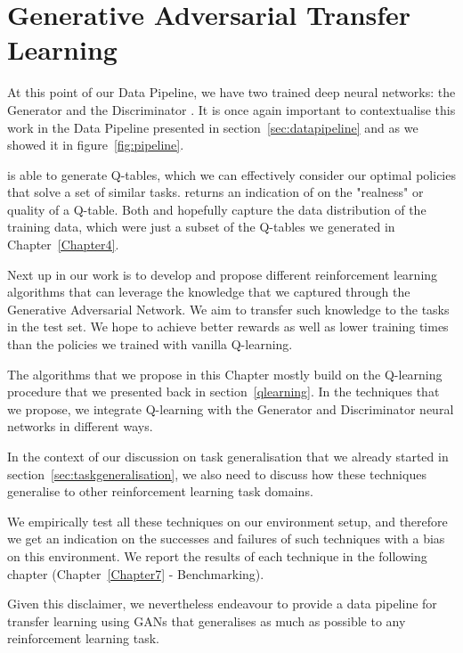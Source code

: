 
\chapter{Generative Adversarial Transfer Learning} %
\label{Chapter6}
At this point of our Data Pipeline, we have two trained deep neural networks: the Generator  and the Discriminator . It is once again important to contextualise this work in the Data Pipeline presented in section~\ref{sec:datapipeline} and as we showed it in figure~\ref{fig:pipeline}.

 is able to generate Q-tables, which we can effectively consider our optimal policies that solve a set of similar tasks.  returns an indication of on the "realness" or quality of a Q-table.
Both  and  hopefully capture the data distribution of the training data, which were just a subset of the Q-tables we generated in Chapter~\ref{Chapter4}.

Next up in our work is to develop and propose different reinforcement learning algorithms that can leverage the knowledge that we captured through the Generative Adversarial Network. We aim to transfer such knowledge to the tasks in the test set. We hope to achieve better rewards as well as lower training times than the policies we trained with vanilla Q-learning.

The algorithms that we propose in this Chapter mostly build on the Q-learning procedure that we presented back in section~\ref{qlearning}. In the techniques that we propose, we integrate Q-learning with the Generator  and Discriminator  neural networks in different ways.

In the context of our discussion on task generalisation that we already started in section~\ref{sec:taskgeneralisation}, we also need to discuss how these techniques generalise to other reinforcement learning task domains. 

We empirically test all these techniques on our  environment setup, and therefore we get an indication on the successes and failures of such techniques with a bias on this environment. We report the results of each technique in the following chapter (Chapter~\ref{Chapter7} - Benchmarking).

Given this disclaimer, we nevertheless endeavour to provide a data pipeline for transfer learning using GANs that generalises as much as possible to any reinforcement learning task.

